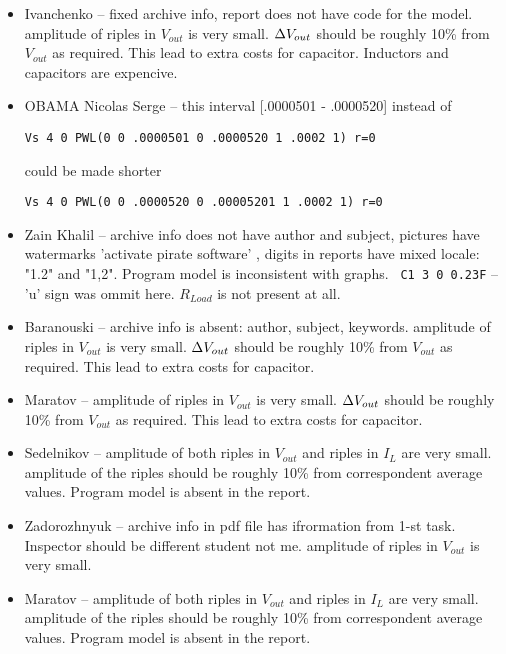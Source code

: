 \documentclass[a4paper,landscape,11pt]{article}
\begin{document}
\begin{itemize}
\item Ivanchenko -- fixed archive info, report does not have code for the model.
 amplitude of riples in $V_{out}$ is very small. ${\small \Delta}V_{out}$ should be roughly 10\% from $V_{out}$ as required. This lead to extra costs for capacitor.
                     Inductors and capacitors are expencive.
\item OBAMA Nicolas Serge -- this interval [.0000501 - .0000520]  instead of
\begin{verbatim}
Vs 4 0 PWL(0 0 .0000501 0 .0000520 1 .0002 1) r=0
\end{verbatim}
could be made shorter
\begin{verbatim}
Vs 4 0 PWL(0 0 .0000520 0 .00005201 1 .0002 1) r=0
\end{verbatim}

\item Zain Khalil -- archive info does not have author and subject, pictures have watermarks 'activate pirate software' , digits in reports have mixed locale: "1.2" and "1,2".
                     Program model is inconsistent with graphs. {\tt~C1~3~0~0.23F} -- 'u' sign was ommit here. $R_{Load}$ is not present at all.
\item Baranouski -- archive info is absent: author, subject, keywords. amplitude of riples in $V_{out}$ is very small.  ${\small \Delta}V_{out}$ should be roughly 10\% from $V_{out}$ as required. This lead to extra costs for capacitor.
\item Maratov --     amplitude of riples in $V_{out}$ is very small. ${\small \Delta}V_{out}$ should be roughly 10\% from $V_{out}$ as required. This lead to extra costs for capacitor.

\item Sedelnikov --  amplitude of both riples in $V_{out}$  and riples in $I_{L}$ are very small. amplitude of the riples should be roughly 10\% from correspondent average values.
                   Program model is absent in the report.
\item Zadorozhnyuk -- archive info in pdf file has ifrormation from 1-st task. Inspector should be different student not me.  amplitude of riples in $V_{out}$ is very small.
\item Maratov -- amplitude of both riples in $V_{out}$  and riples in $I_{L}$ are very small. amplitude of the riples should be roughly 10\% from correspondent average values.
                   Program model is absent in the report.
\end{itemize}
\end{document}
